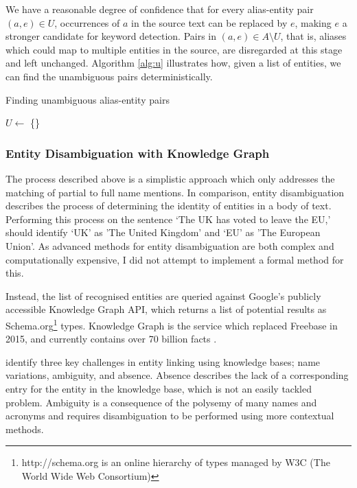 We have a reasonable degree of confidence that for every alias-entity pair $(a, e) \in U$, occurrences of $a$ in the source text can be replaced by $e$, making $e$ a stronger candidate for keyword detection. Pairs in $(a, e) \in A\setminus{U}$, that is, aliases which could map to multiple entities in the source, are disregarded at this stage and left unchanged.  Algorithm \ref{alg:u} illustrates how, given a list of entities, we can find the unambiguous pairs deterministically. 

\begin{algorithm}
\label{alg:u}
 \caption{Finding unambiguous alias-entity pairs}
 $U \gets$ \{\}\;
\end{algorithm}


\subsubsection{Entity Disambiguation with Knowledge Graph}

The process described above is a simplistic approach which only addresses the matching of partial to full name mentions. In comparison, entity disambiguation describes the process of determining the identity of entities in a body of text. Performing this process on the sentence `The UK has voted to leave the EU,' should identify `UK' as 'The United Kingdom' and `EU' as 'The European Union'. As advanced methods for entity disambiguation are both complex and computationally expensive, I did not attempt to implement a formal method for this. 

Instead, the list of recognised entities are queried against Google's publicly accessible Knowledge Graph API, which returns a list of potential results as Schema.org\footnote{http://schema.org is an online hierarchy of types managed by W3C (The World Wide Web Consortium)} types. Knowledge Graph is the service which replaced Freebase in 2015, and currently contains over 70 billion facts \citep{knowledgegraph}.

\cite{EntityDisambiguationForKnowledgeBasePopulation} identify three key challenges in entity linking using knowledge bases; name variations, ambiguity, and absence. Absence describes the lack of a corresponding entry for the entity in the knowledge base, which is not an easily tackled problem. Ambiguity is a consequence of the polysemy of many names and acronyms and requires disambiguation to be performed using more contextual methods. 

